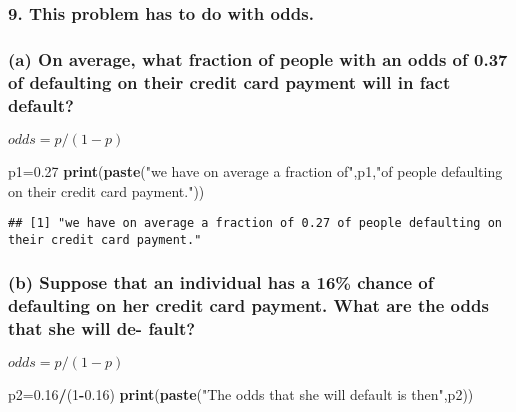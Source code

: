 \documentclass[]{article}
\newenvironment{Shaded}{\begin{snugshade}}{\end{snugshade}}
\newcommand{\KeywordTok}[1]{\textcolor[rgb]{0.13,0.29,0.53}{\textbf{#1}}}
\newcommand{\DecValTok}[1]{\textcolor[rgb]{0.00,0.00,0.81}{#1}}
\newcommand{\FloatTok}[1]{\textcolor[rgb]{0.00,0.00,0.81}{#1}}
\newcommand{\StringTok}[1]{\textcolor[rgb]{0.31,0.60,0.02}{#1}}
\newcommand{\OperatorTok}[1]{\textcolor[rgb]{0.81,0.36,0.00}{\textbf{#1}}}
\newcommand{\NormalTok}[1]{#1}
\begin{document}
\begin{Shaded}
\end{Shaded}

\subsubsection{9. This problem has to do with
odds.}\label{this-problem-has-to-do-with-odds.}

\subsubsection{(a) On average, what fraction of people with an odds of
0.37 of defaulting on their credit card payment will in fact
default?}\label{a-on-average-what-fraction-of-people-with-an-odds-of-0.37-of-defaulting-on-their-credit-card-payment-will-in-fact-default}

\(odds = p/(1-p)\)

\begin{Shaded}
\begin{Highlighting}[]
\NormalTok{p1=}\FloatTok{0.27}
\KeywordTok{print}\NormalTok{(}\KeywordTok{paste}\NormalTok{(}\StringTok{"we have on average a fraction of"}\NormalTok{,p1,}\StringTok{"of people defaulting on their credit card payment."}\NormalTok{))}
\end{Highlighting}
\end{Shaded}

\begin{verbatim}
## [1] "we have on average a fraction of 0.27 of people defaulting on their credit card payment."
\end{verbatim}

\subsubsection{(b) Suppose that an individual has a 16\% chance of
defaulting on her credit card payment. What are the odds that she will
de-
fault?}\label{b-suppose-that-an-individual-has-a-16-chance-of-defaulting-on-her-credit-card-payment.-what-are-the-odds-that-she-will-de--fault}

\(odds = p/(1-p)\)

\begin{Shaded}
\begin{Highlighting}[]
\NormalTok{p2=}\FloatTok{0.16}\OperatorTok{/}\NormalTok{(}\DecValTok{1}\OperatorTok{-}\FloatTok{0.16}\NormalTok{)}
\KeywordTok{print}\NormalTok{(}\KeywordTok{paste}\NormalTok{(}\StringTok{"The odds that she will default is then"}\NormalTok{,p2))}
\end{Highlighting}
\end{Shaded}
\end{document}
